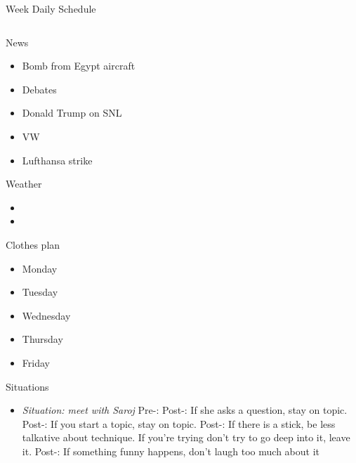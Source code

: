 \begin{frame}
\begin{columns}
\begin{column}{0.50\linewidth}
\begin{block}{Week Daily Schedule}
{    %
    \begin{column}{0.20\linewidth}
      \begin{block}{News}
        \begin{itemize} 
          \tiny \item \tiny Bomb from Egypt aircraft 
        \item \tiny Debates 
        \item \tiny Donald Trump on SNL 
        \item \tiny VW 
        \item \tiny Lufthansa strike  
        \end{itemize}
      \end{block}
      
      \begin{block}{Weather} 
        \begin{itemize}
          \tiny \item \tiny 
        \item \tiny 
        \end{itemize}
      \end{block} 

      \begin{block}{Clothes plan} 
        \begin{itemize}
          \tiny \item \tiny Monday
        \item \tiny Tuesday 
        \item \tiny Wednesday
        \item \tiny Thursday
        \item \tiny Friday 
        \end{itemize} 
      \end{block}
      
      \begin{block}{Situations}

        \begin{itemize} 
          \tiny \item \tiny \textit{Situation: meet with Saroj} Pre-:  
          Post-: If she asks a question, stay on topic. 
          Post-: If you start a topic, stay on topic.  
          Post-: If there is a stick, be less talkative about
          technique. If you're trying don't try to go deep into
          it, leave it. 
          Post-: If something funny happens, don't laugh too much
          about it 



\end{itemize}
\end{block}
\end{column}}
\end{block}
\end{column}
\end{columns}
\end{frame}

